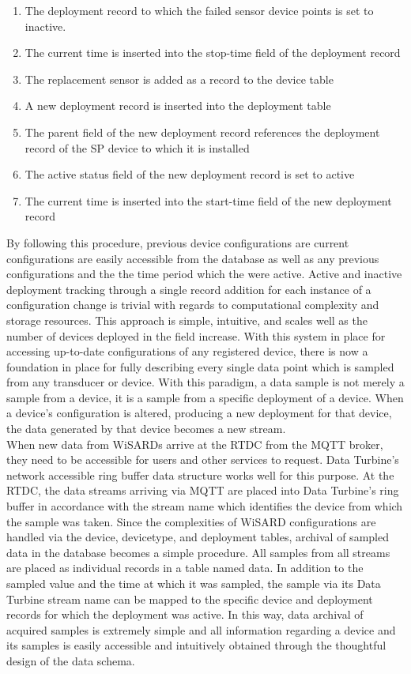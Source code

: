 \begin{enumerate}
	\item The deployment record to which the failed sensor device points is set to inactive.
	\item The current time is inserted into the stop-time field of the deployment record 
	\item The replacement sensor is added as a record to the device table
	\item A new deployment record is inserted into the deployment table
	\item The parent field of the new deployment record references the deployment record of the SP device to which it is installed
	\item The active status field of the new deployment record is set to active
	\item The current time is inserted into the start-time field of the new deployment record
\end{enumerate}

By following this procedure, previous device configurations are current configurations are easily accessible from the database as well as any previous configurations and the the time period which the were active. Active and inactive deployment tracking through a single record addition for each instance of a configuration change is trivial with regards to computational complexity and storage resources. This approach is simple, intuitive, and scales well as the number of devices deployed in the field increase. With this system in place for accessing up-to-date configurations of any registered device, there is now a foundation in place for fully describing every single data point which is sampled from any transducer or device. With this paradigm, a data sample is not merely a sample from a device,  it is a sample from a specific deployment of a device. When a device's configuration is altered, producing a new deployment for that device, the data generated by that device becomes a new stream.\\

When new data from WiSARDs arrive at the RTDC from the MQTT broker, they need to be accessible for users and other services to request. Data Turbine's network accessible ring buffer data structure works well for this purpose. At the RTDC, the data streams arriving via MQTT are placed into Data Turbine's ring buffer in accordance with the stream name which identifies the device from which the sample was taken. Since the complexities of WiSARD configurations are handled via the device, devicetype, and deployment tables, archival of sampled data in the database becomes a simple procedure. All samples from all streams are placed as individual records in a table named data. In addition to the sampled value and the time at which it was sampled, the sample via its Data Turbine stream name can be mapped to the specific device and deployment records for which the deployment was active. In this way, data archival of acquired samples is extremely simple and all information regarding a device and its samples is easily accessible and intuitively obtained through the thoughtful design of the data schema. 

